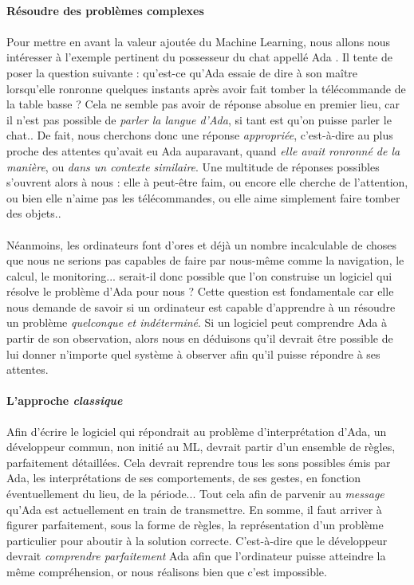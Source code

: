 \paragraph{Résoudre des problèmes complexes}

\paragraph{} Pour mettre en avant la valeur ajoutée du Machine Learning, nous allons nous intéresser à l'exemple pertinent
du possesseur du chat appellé Ada \cite{Internet3}. Il tente de poser la question suivante : qu'est-ce qu'Ada essaie de dire
à son maître lorsqu'elle ronronne quelques instants après avoir fait tomber la télécommande de la table basse ? Cela ne semble
pas avoir de réponse absolue en premier lieu, car il n'est pas possible de \emph{parler la langue d'Ada}, si tant est qu'on puisse
parler le chat.. De fait, nous cherchons donc une réponse \emph{appropriée}, c'est-à-dire au plus proche des attentes qu'avait eu
Ada auparavant, quand \emph{elle avait ronronné de la manière}, ou \emph{dans un contexte similaire}. Une multitude de réponses
possibles s'ouvrent alors à nous : elle à peut-être faim, ou encore elle cherche de l'attention, ou bien elle n'aime pas les
télécommandes, ou elle aime simplement faire tomber des objets.. 

\paragraph{} Néanmoins, les ordinateurs font d'ores et déjà un nombre incalculable de choses que nous ne serions pas capables de faire
par nous-même comme la navigation, le calcul, le monitoring... serait-il donc possible que l'on construise un logiciel qui résolve le problème
d'Ada pour nous ? Cette question est fondamentale car elle nous demande de savoir si un ordinateur est capable d'apprendre à un résoudre un
problème \emph{quelconque et indéterminé}. Si un logiciel peut comprendre Ada à partir de son observation, alors nous en déduisons qu'il devrait
être possible de lui donner n'importe quel système à observer afin qu'il puisse répondre à ses attentes.   

\paragraph{L'approche \emph{classique}} Afin d'écrire le logiciel qui répondrait au problème d'interprétation d'Ada, un développeur commun,
non initié au ML, devrait partir d'un ensemble de règles, parfaitement détaillées. Cela devrait reprendre tous les sons possibles émis par Ada,
les interprétations de ses comportements, de ses gestes, en fonction éventuellement du lieu, de la période... Tout cela afin de parvenir au 
\emph{message} qu'Ada est actuellement en train de transmettre. En somme, il faut arriver à figurer parfaitement, sous la forme de règles,
la représentation d'un problème particulier pour aboutir à la solution correcte. C'est-à-dire que le développeur devrait \emph{comprendre parfaitement}
Ada afin que l'ordinateur puisse atteindre la même compréhension, or nous réalisons bien que c'est impossible.

